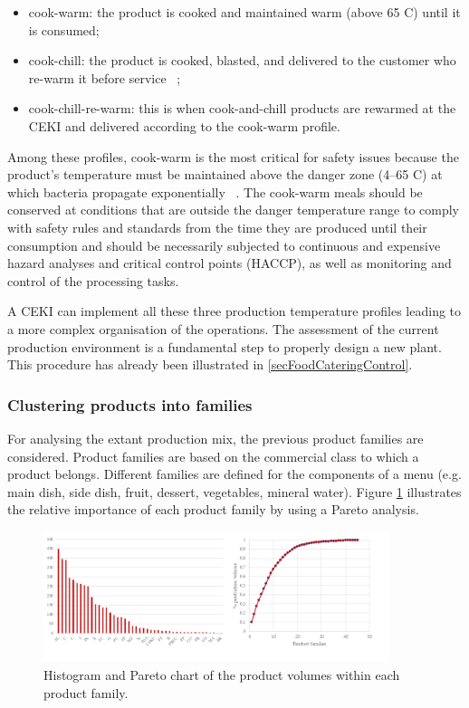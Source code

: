 \begin{itemize}
    \item cook-warm: the product is cooked and maintained warm (above 65 \degree C) until it is consumed; 
    \item cook-chill: the product is cooked, blasted, and delivered to the customer who re-warm it before service ~\cite{Williams1996};
    \item cook-chill-re-warm: this is when cook-and-chill products are rewarmed at the CEKI and delivered according to the cook-warm profile.
\end{itemize}

Among these profiles, cook-warm is the most critical for safety issues because the product’s temperature must be maintained above the danger zone (4–65 \degree C) at which bacteria propagate exponentially ~\cite{Rahman2002}. The cook-warm meals should be conserved at conditions that are outside the danger temperature range to comply with safety rules and standards from the time they are produced until their consumption and should be necessarily subjected to continuous and expensive hazard analyses and critical control points (HACCP), as well as monitoring and control of the processing tasks. \par

A CEKI can implement all these three production temperature profiles leading to a more complex organisation of the operations. The assessment of the current production environment is a fundamental step to properly design a new plant. This procedure has already been illustrated in \ref{secFoodCateringControl}.

\subsubsection{Clustering products into families}
For analysing the extant production mix, the previous product families are considered. Product families are based on the commercial class to which a product belongs. Different families are defined for the components of a menu (e.g. main dish, side dish, fruit, dessert, vegetables, mineral water). Figure \ref{fig_prod_CAMST_productFamilies} illustrates the relative importance of each product family by using a Pareto analysis.


\begin{figure}[hbt!]
\centering
\includegraphics[width=0.9\textwidth]{sectionProduction/design_plant_figures/fig_prod_CAMST_productFamilies.png}
\captionsetup{type=figure}
\caption{Histogram and Pareto chart of the product volumes within each product family.}
\label{fig_prod_CAMST_productFamilies}
\end{figure}

